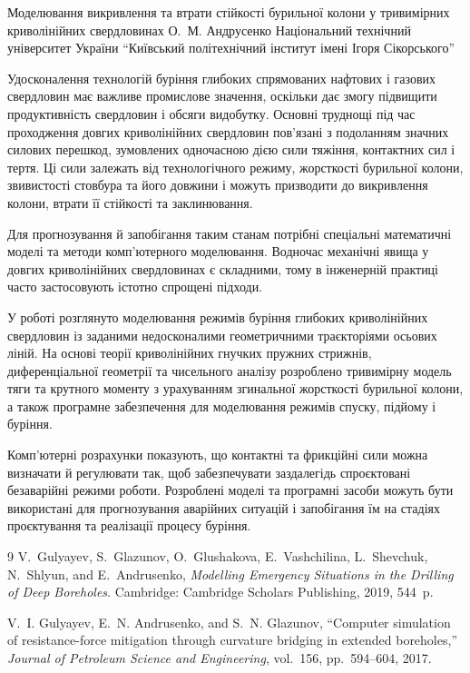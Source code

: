 \ReportHeading
  {Моделювання викривлення та втрати стійкості бурильної колони у тривимірних криволінійних свердловинах}
  {О.~М. Андрусенко}
  {Національний технічний університет України ``Київський політехнічний інститут імені Ігоря Сікорського''}
  {}

Удосконалення технологій буріння глибоких спрямованих нафтових і газових свердловин має важливе промислове значення, оскільки дає змогу підвищити продуктивність свердловин і обсяги видобутку. Основні труднощі під час проходження довгих криволінійних свердловин пов’язані з подоланням значних силових перешкод, зумовлених одночасною дією сили тяжіння, контактних сил і тертя. Ці сили залежать від технологічного режиму, жорсткості бурильної колони, звивистості стовбура та його довжини і можуть призводити до викривлення колони, втрати її стійкості та заклинювання.

Для прогнозування й запобігання таким станам потрібні спеціальні математичні моделі та методи комп’ютерного моделювання. Водночас механічні явища у довгих криволінійних свердловинах є складними, тому в інженерній практиці часто застосовують істотно спрощені підходи.

У роботі розглянуто моделювання режимів буріння глибоких криволінійних свердловин із заданими недосконалими геометричними траєкторіями осьових ліній. На основі теорії криволінійних гнучких пружних стрижнів, диференціальної геометрії та чисельного аналізу розроблено тривимірну модель тяги та крутного моменту з урахуванням згинальної жорсткості бурильної колони, а також програмне забезпечення для моделювання режимів спуску, підйому і буріння.

Комп’ютерні розрахунки показують, що контактні та фрикційні сили можна визначати й регулювати так, щоб забезпечувати заздалегідь спроєктовані безаварійні режими роботи. Розроблені моделі та програмні засоби можуть бути використані для прогнозування аварійних ситуацій і запобігання їм на стадіях проєктування та реалізації процесу буріння.

\renewcommand{\refname}{Список використаних джерел}
\begin{thebibliography}{9}
V.~Gulyayev, S.~Glazunov, O.~Glushakova, E.~Vashchilina, L.~Shevchuk, N.~Shlyun, and E.~Andrusenko,
\emph{Modelling Emergency Situations in the Drilling of Deep Boreholes}.
Cambridge: Cambridge Scholars Publishing, 2019, 544~p.

V.~I. Gulyayev, E.~N. Andrusenko, and S.~N. Glazunov,
``Computer simulation of resistance-force mitigation through curvature bridging in extended boreholes,''
\emph{Journal of Petroleum Science and Engineering}, vol.~156, pp.~594--604, 2017.
\end{thebibliography}
